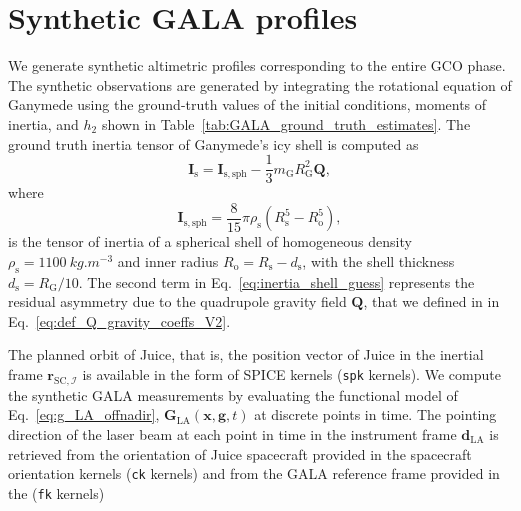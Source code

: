 \documentclass[pdflatex,sn-mathphys-num]{sn-jnl}%
\theoremstyle{thmstyleone}%
\theoremstyle{thmstyletwo}%
\theoremstyle{thmstylethree}%
\renewcommand{\vec}[1]{\boldsymbol{#1}}
\begin{document}
\section{Synthetic GALA profiles}\label{sec:GALA_data}
%
We generate synthetic altimetric profiles corresponding to the   entire GCO phase.
The synthetic observations are generated by integrating the rotational equation of Ganymede using the ground-truth values of the initial conditions, moments of inertia, and $h_2$ shown in Table~\ref{tab:GALA_ground_truth_estimates}. 
%
The ground truth inertia tensor of Ganymede's icy shell is computed as
%
\begin{equation}
	\label{eq:inertia_shell_guess}
	\vec{I}_{\mathrm{s}} = \vec{I}_{\mathrm{s,sph}} - \frac{1}{3}m_{\mathrm{G}}R_{\mathrm{G}}^2 \vec{Q}, 
\end{equation}
where 
\begin{equation}
	\vec{I}_{\mathrm{s,sph}} = \frac{8}{15}\pi \rho_{\mathrm{s}}\left(R_{\mathrm{s}}^5 - R_{\mathrm{o}}^5\right),
\end{equation}
is the tensor of inertia of a spherical shell of homogeneous density 
${\rho_\mathrm{s} = \SI{1100}{kg.m^{-3}}}$
and inner radius ${R_{\mathrm{o}} = R_{\mathrm{s}}-d_{\mathrm{s}}}$, with the shell thickness
${d_\mathrm{s} = R_\mathrm{G}/10}$.
%
The second term in Eq.~\eqref{eq:inertia_shell_guess} represents the residual asymmetry due to the quadrupole gravity field $\vec{Q}$, that we defined in in Eq.~\eqref{eq:def_Q_gravity_coeffs_V2}.


%  
%

The planned orbit of Juice, that is, the position vector of Juice in the inertial frame $\vec{r}_{\mathrm{SC},\mathcal{I}}$ is available in the form of SPICE kernels (\texttt{spk} kernels).
We compute the synthetic GALA measurements by evaluating the functional model of Eq.~\eqref{eq:g_LA_offnadir}, $\vec{G}_{\mathrm{LA}}(\vec{x},\vec{g},t)$ at discrete points in time. 
%
The pointing direction of the laser beam at each point in time in the instrument frame $\vec{d}_{\mathrm{LA}}$ is retrieved from the orientation of  Juice spacecraft provided in the spacecraft orientation kernels (\texttt{ck} kernels) and from the  GALA reference frame provided in the (\texttt{fk} kernels)
\end{document}
